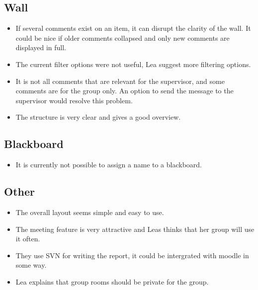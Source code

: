 \subsection*{Wall}
\begin{itemize}
	\item If several comments exist on an item, it can disrupt the clarity of the wall. It could be nice if older comments collapsed and only new comments are displayed in full.
	\item The current filter options were not useful, Lea suggest more filtering options.
	\item It is not all comments that are relevant for the supervisor, and some comments are for the group only. An option to send the message to the supervisor would resolve this problem.
	\item The structure is very clear and gives a good overview.
\end{itemize}


\subsection*{Blackboard}
\begin{itemize}
	\item It is currently not possible to assign a name to a blackboard.
\end{itemize}


\subsection*{Other}
\begin{itemize}
	\item The overall layout seems simple and easy to use.
	\item The meeting feature is very attractive and Leas thinks that her group will use it often.
	\item They use SVN for writing the report, it could be intergrated with moodle in some way.
	\item Lea explains that group rooms should be private for the group.
\end{itemize}


